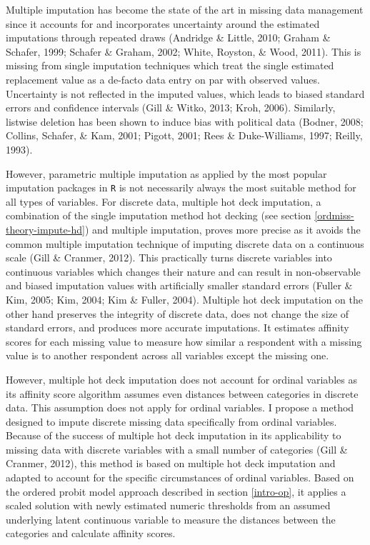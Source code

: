 \documentclass[12pt,econ]{sources/authesis}
\begin{document}
Multiple imputation has become the state of the art in missing data management since it accounts for and incorporates uncertainty around the estimated imputations through repeated draws (Andridge \& Little, 2010; Graham \& Schafer, 1999; Schafer \& Graham, 2002; White, Royston, \& Wood, 2011). This is missing from single imputation techniques which treat the single estimated replacement value as a de-facto data entry on par with observed values. Uncertainty is not reflected in the imputed values, which leads to biased standard errors and confidence intervals (Gill \& Witko, 2013; Kroh, 2006). Similarly, listwise deletion has been shown to induce bias with political data (Bodner, 2008; Collins, Schafer, \& Kam, 2001; Pigott, 2001; Rees \& Duke-Williams, 1997; Reilly, 1993).

However, parametric multiple imputation as applied by the most popular imputation packages in \texttt{R} is not necessarily always the most suitable method for all types of variables. For discrete data, multiple hot deck imputation, a combination of the single imputation method hot decking (see section \ref{ordmiss-theory-impute-hd}) and multiple imputation, proves more precise as it avoids the common multiple imputation technique of imputing discrete data on a continuous scale (Gill \& Cranmer, 2012). This practically turns discrete variables into continuous variables which changes their nature and can result in non-observable and biased imputation values with artificially smaller standard errors (Fuller \& Kim, 2005; Kim, 2004; Kim \& Fuller, 2004). Multiple hot deck imputation on the other hand preserves the integrity of discrete data, does not change the size of standard errors, and produces more accurate imputations. It estimates affinity scores for each missing value to measure how similar a respondent with a missing value is to another respondent across all variables except the missing one.

However, multiple hot deck imputation does not account for ordinal variables as its affinity score algorithm assumes even distances between categories in discrete data. This assumption does not apply for ordinal variables. I propose a method designed to impute discrete missing data specifically from ordinal variables. Because of the success of multiple hot deck imputation in its applicability to missing data with discrete variables with a small number of categories (Gill \& Cranmer, 2012), this method is based on multiple hot deck imputation and adapted to account for the specific circumstances of ordinal variables. Based on the ordered probit model approach described in section \ref{intro-op}, it applies a scaled solution with newly estimated numeric thresholds from an assumed underlying latent continuous variable to measure the distances between the categories and calculate affinity scores.
\end{document}
